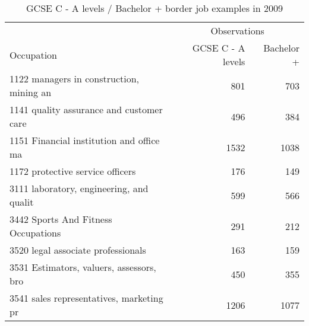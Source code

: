 \begin{table}[h!]
	\centering
	\caption{GCSE C - A levels / Bachelor + border job examples in 2009}
	\begin{tabular}{lrr}
	\toprule
	\toprule
	&\multicolumn{2}{c}{Observations}\\
	Occupation&GCSE C - A levels &Bachelor +\\
\hline
1122 managers in construction, mining an&801&703 \\
1141 quality assurance and customer care&496&384 \\
1151 Financial institution and office ma&1532&1038 \\
1172 protective service officers&176&149 \\
3111 laboratory, engineering, and qualit&599&566 \\
3442 Sports And Fitness Occupations&291&212 \\
3520 legal associate professionals&163&159 \\
3531 Estimators, valuers, assessors, bro&450&355 \\
3541 sales representatives, marketing pr&1206&1077 \\
\bottomrule
\bottomrule
\end{tabular}
\end{table}

